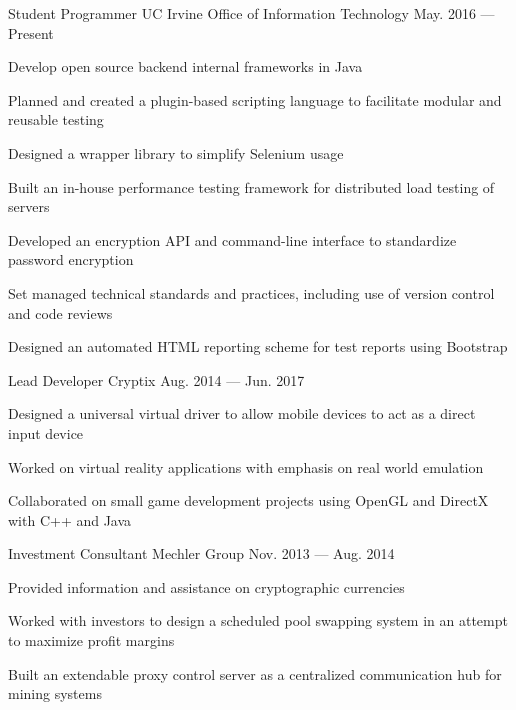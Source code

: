 \vspace{-1.0mm}

\begin{entries}
  \vspace{-1.0mm}
  \entry%
    {Student Programmer}%
    {UC Irvine Office of Information Technology}%
    {}%
    {May. 2016 --- Present}%
    {
      \begin{entryitems}
        \item Develop open source backend internal frameworks in Java
        \vspace{2.0mm}
        \begin{entryitems}
          \item Planned and created a plugin-based scripting language to facilitate modular and %
          reusable testing
          \item Designed a wrapper library to simplify Selenium usage
          \item Built an in-house performance testing framework for distributed load testing %
          of servers
          \item Developed an encryption API and command-line interface to standardize %
          password encryption
        \end{entryitems}
        \vspace{2.0mm}
        \item Set managed technical standards and practices, including use of version control %
        and code reviews
        \item Designed an automated HTML reporting scheme for test reports using Bootstrap
      \end{entryitems}
    }
  
  \entry%
    {Lead Developer}%
    {Cryptix}%
    {}%
    {Aug. 2014 --- Jun. 2017}%
    {
      \begin{entryitems}
        \item Designed a universal virtual driver to allow mobile devices to act as a direct %
        input device
        \item Worked on virtual reality applications with emphasis on real world emulation
        \item Collaborated on small game development projects using OpenGL and DirectX with %
        C++ and Java
      \end{entryitems}
    }

  \entry%
    {Investment Consultant}%
    {Mechler Group}%
    {}%
    {Nov. 2013 --- Aug. 2014}%
    {
      \begin{entryitems}
        \item Provided information and assistance on cryptographic currencies
        \item Worked with investors to design a scheduled pool swapping system in an attempt to %
        maximize profit margins
        \item Built an extendable proxy control server as a centralized communication %
        hub for mining systems
      \end{entryitems}
    }


\end{entries}

